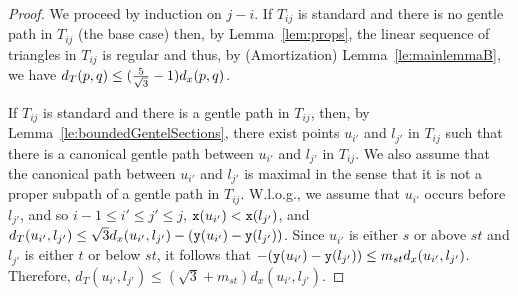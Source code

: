 \begin{proof}

We proceed by induction on $j-i$. If $T_{ij}$ is standard and there
is no gentle path in $T_{ij}$ (the base case) then, by Lemma~\ref{lem:props},
the linear sequence of triangles in $T_{ij}$ is regular and thus, by (Amortization)
Lemma~\ref{le:mainlemmaB}, we have $d_T(p,q) \leq (\frac{5}{\sqrt{3}}-1) d_x(p,q)$.

If $T_{ij}$ is standard and there is a gentle path in $T_{ij}$,
then, by Lemma~\ref{le:boundedGentelSections}, there
exist points $u_{i'}$ and $l_{j'}$ in $T_{ij}$ such that there is a canonical
gentle path between $u_{i'}$ and $l_{j'}$ in $T_{ij}$. We also
assume that the canonical path between $u_{i'}$ and $l_{j'}$ is maximal in the
sense that it is not a proper subpath of a gentle path in $T_{ij}$. W.l.o.g.,
we assume that $u_{i'}$ occurs before $l_{j'}$, and so 
$i-1 \leq i' \leq j' \leq j$, ${\tt x}(u_{i'}) < {\tt x}(l_{j'})$, and
$d_T(u_{i'},l_{j'}) \leq \sqrt{3}d_x(u_{i'},l_{j'})-({\tt y}(u_{i'})-{\tt y}(l_{j'}))$.
Since $u_{i'}$ is either $s$
or above $st$ and $l_{j'}$ is either $t$ or below $st$, it follows that
$-({\tt y}(u_{i'})-{\tt y}(l_{j'}))\leq m_{st}d_x(u_{i'},l_{j'})$. Therefore,
$d_T(u_{i'},l_{j'}) \leq (\sqrt{3}+m_{st})d_x(u_{i'},l_{j'})$.


\end{proof}

